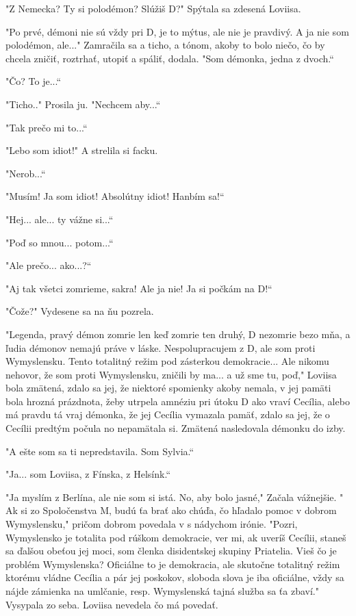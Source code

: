 \documentclass{book}
\begin{document}
"Z Nemecka? Ty si polodémon? Slúžiš D?"$ $ Spýtala sa zdesená Loviisa.

"Po prvé, démoni nie sú vždy pri D, je to mýtus, ale nie je pravdivý. A ja nie som polodémon, ale..."$ $ Zamračila sa a ticho, a tónom, akoby to bolo niečo, čo by chcela zničiť, roztrhať, utopiť a spáliť, dodala. "Som démonka, jedna z dvoch.“

"Čo? To je...“

"Ticho.."$ $ Prosila ju. "Nechcem aby...“

"Tak prečo mi to...“

"Lebo som idiot!"$ $ A strelila si facku.

"Nerob...“

"Musím! Ja som idiot! Absolútny idiot! Hanbím sa!“

"Hej... ale... ty vážne si...“

"Poď so mnou... potom...“

"$ $Ale prečo... ako...?“

"$ $Aj tak všetci zomrieme, sakra! Ale ja nie! Ja si počkám na D!“

"Čože?"$ $ Vydesene sa na ňu pozrela.

"Legenda, pravý démon zomrie len keď zomrie ten druhý, D nezomrie bezo mňa, a ľudia démonov nemajú práve v láske. Nespolupracujem z D, ale som proti Wymyslensku. Tento totalitný režim pod zásterkou demokracie... Ale nikomu nehovor, že som proti Wymyslensku, zničili by ma... a už sme tu, poď,"$ $ Loviisa bola zmätená, zdalo sa jej, že niektoré spomienky akoby nemala, v jej pamäti bola hrozná prázdnota, žeby utrpela amnéziu pri útoku D ako vraví Cecília, alebo má pravdu tá vraj démonka, že jej Cecília vymazala pamäť, zdalo sa jej, že o Cecílii predtým počula no nepamätala si. Zmätená nasledovala démonku do izby.

"$ $A ešte som sa ti nepredstavila. Som Sylvia.“

"Ja... som Loviisa, z Fínska, z Helsínk.“

"Ja myslím z Berlína, ale nie som si istá. No, aby bolo jasné,"$ $ Začala vážnejšie. "$ $Ak si zo Spoločenstva M, budú ťa brať ako chúďa, čo hľadalo pomoc v dobrom Wymyslensku,"$ $ pričom dobrom povedala v s nádychom irónie. "Pozri, Wymyslensko je totalita pod rúškom demokracie, ver mi, ak uveríš Cecílii, staneš sa ďalšou obeťou jej moci, som členka disidentskej skupiny Priatelia. Vieš čo je problém Wymyslenska? Oficiálne to je demokracia, ale skutočne totalitný režim ktorému vládne Cecília a pár jej poskokov, sloboda slova je iba oficiálne, vždy sa nájde zámienka na umlčanie, resp. Wymyslenská tajná služba sa ťa zbaví."$ $ Vysypala zo seba. Loviisa nevedela čo má povedať.
\end{document}
